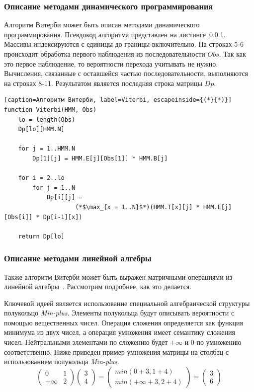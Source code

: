 \subsubsection{Описание методами динамического программирования}
\label{lab:dyn_Viterbi}
Алгоритм Витерби может быть описан методами динамического программирования.
Псевдокод алгоритма представлен на листинге~\ref{lab:dyn_Viterbi}.
Массивы индексируются с единицы до границы включительно.
На строках 5-6 происходит обработка первого наблюдения из последовательности $Obs$.
Так как это первое наблюдение, то вероятности перехода учитывать не нужно.
Вычисления, связанные с оставшейся частью последовательности, выполняются на строках 8-11.
Результатом является последняя строка матрицы $Dp$.
\begin{lstlisting}[caption=Алгоритм Витерби, label=Viterbi, escapeinside={(*}{*)}]
function Viterbi(HMM, Obs)
	lo = length(Obs)
	Dp[lo][HMM.N]

	for j = 1..HMM.N
		Dp[1][j] = HMM.E[j][Obs[1]] * HMM.B[j]
	
	for i = 2..lo
		for j = 1..N
			Dp[i][j] = 
					(*$\max_{x = 1..N}$*)(HMM.T[x][j] * HMM.E[j][Obs[i]] * Dp[i-1][x])

	return Dp[lo]
\end{lstlisting}


\subsubsection{Описание методами линейной алгебры}
\label{lab:LA_Viterbi}
Также алгоритм Витерби может быть выражен матричными 
операциями из линейной алгебры~\cite{LA_Viterbi}.
Рассмотрим подробнее, как это делается.

Ключевой идеей является использование специальной 
алгебраической структуры полукольцо \emph{Min-plus}.
Элементы полукольца будут описывать вероятности с
помощью вещественных чисел.
Операция сложения определяется как функция
минимума из двух чисел, а операция умножения имеет семантику
сложения чисел.
Нейтральными элементами по сложению будет $+\infty$ 
и 0 по умножению соответственно.
Ниже приведен пример умножения матрицы на столбец 
с использованием полукольца \emph{Min-plus}.
\[
  \begin{pmatrix}
    0 & 1 \\
    +\infty & 2
  \end{pmatrix}
  \begin{pmatrix}
    3 \\
    4
  \end{pmatrix}
  =
  \begin{pmatrix}
    min(0 + 3, 1 + 4) \\
    min(+\infty + 3, 2 + 4)
  \end{pmatrix}
  =
  \begin{pmatrix}
    3 \\
    6
  \end{pmatrix}
\]


